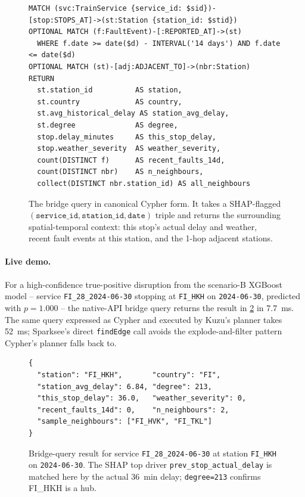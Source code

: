 \begin{figure}[H]
\begin{lstlisting}[language=Cypher]
MATCH (svc:TrainService {service_id: $sid})-[stop:STOPS_AT]->(st:Station {station_id: $stid})
OPTIONAL MATCH (f:FaultEvent)-[:REPORTED_AT]->(st)
  WHERE f.date >= date($d) - INTERVAL('14 days') AND f.date <= date($d)
OPTIONAL MATCH (st)-[adj:ADJACENT_TO]->(nbr:Station)
RETURN
  st.station_id          AS station,
  st.country             AS country,
  st.avg_historical_delay AS station_avg_delay,
  st.degree              AS degree,
  stop.delay_minutes     AS this_stop_delay,
  stop.weather_severity  AS weather_severity,
  count(DISTINCT f)      AS recent_faults_14d,
  count(DISTINCT nbr)    AS n_neighbours,
  collect(DISTINCT nbr.station_id) AS all_neighbours
\end{lstlisting}
\caption{The bridge query in canonical Cypher form. It takes a SHAP-flagged $(\texttt{service\_id}, \texttt{station\_id}, \texttt{date})$ triple and returns the surrounding spatial-temporal context: this stop's actual delay and weather, recent fault events at this station, and the 1-hop adjacent stations.}
\label{lst:kg-bridge}
\end{figure}

\paragraph{Live demo.} For a high-confidence true-positive disruption from the scenario-B XGBoost model -- service \texttt{FI\_28\_2024-06-30} stopping at \texttt{FI\_HKH} on \texttt{2024-06-30}, predicted with $p=1.000$ -- the native-API bridge query returns the result in \cref{lst:kg-result} in \SI{7.7}{ms}. The same query expressed as Cypher and executed by Kuzu's planner takes \SI{52}{ms}; Sparksee's direct \texttt{findEdge} call avoids the explode-and-filter pattern Cypher's planner falls back to.

\begin{figure}[H]
\begin{lstlisting}
{
  "station": "FI_HKH",       "country": "FI",
  "station_avg_delay": 6.84, "degree": 213,
  "this_stop_delay": 36.0,   "weather_severity": 0,
  "recent_faults_14d": 0,    "n_neighbours": 2,
  "sample_neighbours": ["FI_HVK", "FI_TKL"]
}
\end{lstlisting}
\caption{Bridge-query result for service \texttt{FI\_28\_2024-06-30} at station \texttt{FI\_HKH} on \texttt{2024-06-30}. The SHAP top driver \texttt{prev\_stop\_actual\_delay} is matched here by the actual \SI{36}{min} delay; \texttt{degree=213} confirms FI\_HKH is a hub.}
\label{lst:kg-result}
\end{figure}

